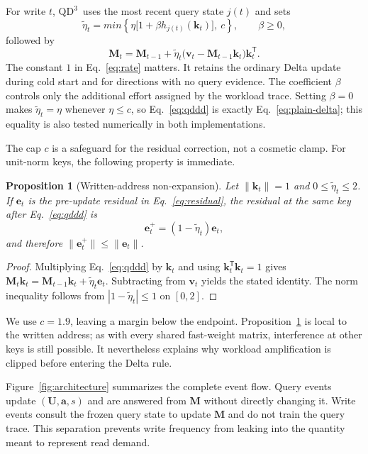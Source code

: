 \documentclass[pdflatex,sn-mathphys-num]{sn-jnl}
\theoremstyle{thmstyleone}
\newtheorem{proposition}{Proposition}
\newcommand{\M}{\bm{M}}
\newcommand{\U}{\bm{U}}
\newcommand{\kvec}{\bm{k}}
\newcommand{\vvec}{\bm{v}}
\newcommand{\evec}{\bm{e}}
\newcommand{\avec}{\bm{a}}
\newcommand{\norm}[1]{\lVert#1\rVert}
\newcommand{\QDDD}{\ensuremath{\mathrm{QD}^{3}}}
\begin{document}
For write $t$, \QDDD\ uses the most recent query state $j(t)$ and sets
\begin{equation}
 \widetilde\eta_t=min\left\{
 \eta\bigl[1+\beta h_{j(t)}(\kvec_t)\bigr],\ c\right\},
 \qquad \beta\geq0,
 \label{eq:rate}
\end{equation}
followed by
\begin{equation}
 \M_t=\M_{t-1}+\widetilde\eta_t
 \bigl(\vvec_t-\M_{t-1}\kvec_t\bigr)\kvec_t^{\mathsf T}.
 \label{eq:qddd}
\end{equation}
The constant $1$ in Eq.~\eqref{eq:rate} matters. It retains the ordinary Delta update during cold start and for directions with no query evidence. The coefficient $\beta$ controls only the additional effort assigned by the workload trace. Setting $\beta=0$ makes $\widetilde\eta_t=\eta$ whenever $\eta\leq c$, so Eq.~\eqref{eq:qddd} is exactly Eq.~\eqref{eq:plain-delta}; this equality is also tested numerically in both implementations.

The cap $c$ is a safeguard for the residual correction, not a cosmetic clamp. For unit-norm keys, the following property is immediate.

\begin{proposition}[Written-address non-expansion]\label{prop:stable}
Let $\norm{\kvec_t}=1$ and $0\leq\widetilde\eta_t\leq2$. If $\evec_t$ is the pre-update residual in Eq.~\eqref{eq:residual}, the residual at the same key after Eq.~\eqref{eq:qddd} is
\begin{equation}
 \evec_t^{+}=(1-\widetilde\eta_t)\evec_t,
\end{equation}
and therefore $\norm{\evec_t^{+}}\leq\norm{\evec_t}$.
\end{proposition}

\begin{proof}
Multiplying Eq.~\eqref{eq:qddd} by $\kvec_t$ and using $\kvec_t^{\mathsf T}\kvec_t=1$ gives
$\M_t\kvec_t=\M_{t-1}\kvec_t+\widetilde\eta_t\evec_t$.
Subtracting from $\vvec_t$ yields the stated identity. The norm inequality follows from $|1-\widetilde\eta_t|\leq1$ on $[0,2]$.
\end{proof}

We use $c=1.9$, leaving a margin below the endpoint. Proposition~\ref{prop:stable} is local to the written address; as with every shared fast-weight matrix, interference at other keys is still possible. It nevertheless explains why workload amplification is clipped before entering the Delta rule.

Figure~\ref{fig:architecture} summarizes the complete event flow. Query events update $(\U,\avec,s)$ and are answered from $\M$ without directly changing it. Write events consult the frozen query state to update $\M$ and do not train the query trace. This separation prevents write frequency from leaking into the quantity meant to represent read demand.
\end{document}
